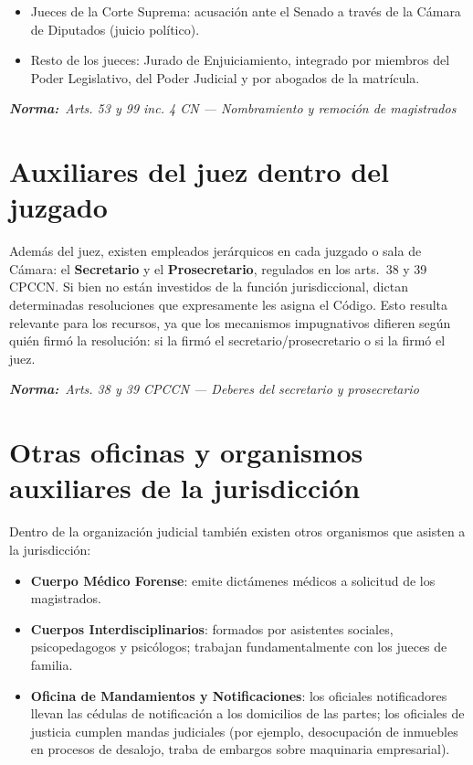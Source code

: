 \documentclass[12pt,oneside]{book}
\newcommand{\normaref}[1]{%
    \par\noindent\textbf{\textit{Norma:}}~\textit{#1}\par\vspace{0.2em}
}
\begin{document}
\begin{itemize}
    \item Jueces de la Corte Suprema: acusación ante el Senado a través de la Cámara de Diputados (juicio político).
    \item Resto de los jueces: Jurado de Enjuiciamiento, integrado por miembros del Poder Legislativo, del Poder Judicial y por abogados de la matrícula.
\end{itemize}

\normaref{Arts. 53 y 99 inc. 4 CN --- Nombramiento y remoción de magistrados}

\section{Auxiliares del juez dentro del juzgado}

Además del juez, existen empleados jerárquicos en cada juzgado o sala de Cámara: el \textbf{Secretario} y el \textbf{Prosecretario}, regulados en los arts.\ 38 y 39 CPCCN. Si bien no están investidos de la función jurisdiccional, dictan determinadas resoluciones que expresamente les asigna el Código. Esto resulta relevante para los recursos, ya que los mecanismos impugnativos difieren según quién firmó la resolución: si la firmó el secretario/prosecretario o si la firmó el juez.

\normaref{Arts. 38 y 39 CPCCN --- Deberes del secretario y prosecretario}

\section{Otras oficinas y organismos auxiliares de la jurisdicción}

Dentro de la organización judicial también existen otros organismos que asisten a la jurisdicción:

\begin{itemize}
    \item \textbf{Cuerpo Médico Forense}: emite dictámenes médicos a solicitud de los magistrados.
    \item \textbf{Cuerpos Interdisciplinarios}: formados por asistentes sociales, psicopedagogos y psicólogos; trabajan fundamentalmente con los jueces de familia.
    \item \textbf{Oficina de Mandamientos y Notificaciones}: los oficiales notificadores llevan las cédulas de notificación a los domicilios de las partes; los oficiales de justicia cumplen mandas judiciales (por ejemplo, desocupación de inmuebles en procesos de desalojo, traba de embargos sobre maquinaria empresarial).
\end{itemize}
\end{document}
